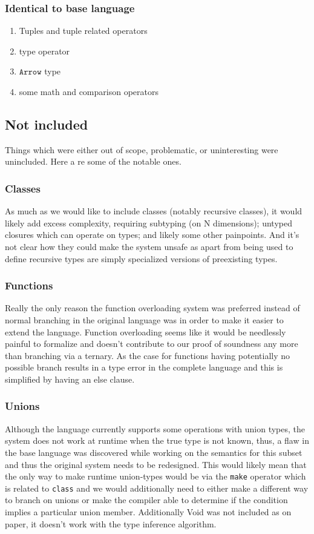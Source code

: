 \documentclass{article}
\begin{document}
\subsubsection{Identical to base language}
\begin{enumerate}
    \item Tuples and tuple related operators
    \item type operator
    \item $\texttt{Arrow}$ type
    \item some math and comparison operators
\end{enumerate}

\subsection{Not included}
Things which were either out of scope, problematic, or uninteresting were unincluded. Here a re some of the notable ones.

\subsubsection{Classes}
As much as we would like to include classes (notably recursive classes), it 
would likely add excess complexity, requiring subtyping (on N dimensions); 
untyped closures which can operate on types; and likely some other painpoints.
And it's not clear how they could make the system unsafe as apart from being
used to define recursive types are simply specialized versions of preexisting
types.

\subsubsection{Functions}
Really the only reason the function overloading system was preferred instead
of normal branching in the original language was in order to make it easier 
to extend the language. Function overloading seems like it would be needlessly
painful to formalize and doesn't contribute to our proof of soundness any more
than branching via a ternary. As the case for functions having potentially no
possible branch results in a type error in the complete language and this is
simplified by having an else clause.

\subsubsection{Unions}
Although the language currently supports some operations with union types,
the system does not work at runtime when the true type is not known, thus,
a flaw in the base language was discovered while working on the semantics
for this subset and thus the original system needs to be redesigned. This
would likely mean that the only way to make runtime union-types would be
via the \texttt{make} operator which is related to \texttt{class} and we
would additionally need to either make a different way to branch on unions
or make the compiler able to determine if the condition implies a particular
union member. Additionally Void was not included as on paper, it doesn't
work with the type inference algorithm.
\end{document}
